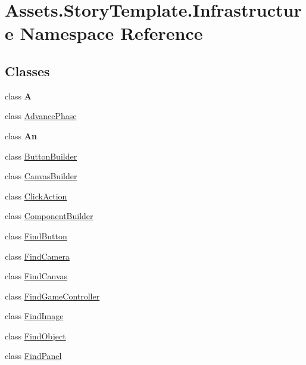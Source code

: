 \hypertarget{namespaceAssets_1_1StoryTemplate_1_1Infrastructure}{}\section{Assets.\+Story\+Template.\+Infrastructure Namespace Reference}
\label{namespaceAssets_1_1StoryTemplate_1_1Infrastructure}
\subsection*{Classes}
\begin{DoxyCompactItemize}
\item 
class {\bfseries A}
\item 
class \hyperlink{classAssets_1_1StoryTemplate_1_1Infrastructure_1_1AdvancePhase}{Advance\+Phase}
\item 
class {\bfseries An}
\item 
class \hyperlink{classAssets_1_1StoryTemplate_1_1Infrastructure_1_1ButtonBuilder}{Button\+Builder}
\item 
class \hyperlink{classAssets_1_1StoryTemplate_1_1Infrastructure_1_1CanvasBuilder}{Canvas\+Builder}
\item 
class \hyperlink{classAssets_1_1StoryTemplate_1_1Infrastructure_1_1ClickAction}{Click\+Action}
\item 
class \hyperlink{classAssets_1_1StoryTemplate_1_1Infrastructure_1_1ComponentBuilder}{Component\+Builder}
\item 
class \hyperlink{classAssets_1_1StoryTemplate_1_1Infrastructure_1_1FindButton}{Find\+Button}
\item 
class \hyperlink{classAssets_1_1StoryTemplate_1_1Infrastructure_1_1FindCamera}{Find\+Camera}
\item 
class \hyperlink{classAssets_1_1StoryTemplate_1_1Infrastructure_1_1FindCanvas}{Find\+Canvas}
\item 
class \hyperlink{classAssets_1_1StoryTemplate_1_1Infrastructure_1_1FindGameController}{Find\+Game\+Controller}
\item 
class \hyperlink{classAssets_1_1StoryTemplate_1_1Infrastructure_1_1FindImage}{Find\+Image}
\item 
class \hyperlink{classAssets_1_1StoryTemplate_1_1Infrastructure_1_1FindObject}{Find\+Object}
\item 
class \hyperlink{classAssets_1_1StoryTemplate_1_1Infrastructure_1_1FindPanel}{Find\+Panel}
\item 

\end{DoxyCompactItemize}
